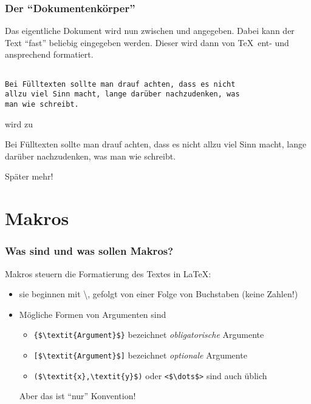 \begin{frame}[fragile]
  \frametitle{Der \enquote{Dokumentenkörper}}

  \onslide<+->

  Das eigentliche Dokument wird nun zwischen \lstinline!! und
    \lstinline!! angegeben.  Dabei kann der Text \enquote{fast} beliebig
  eingegeben werden.  Dieser wird dann von \TeX\ ent- und ansprechend formatiert.

  \onslide<+->

\begin{lstlisting}

Bei Fülltexten sollte man drauf achten, dass es nicht
allzu viel Sinn macht, lange darüber nachzudenken, was
man wie schreibt.

\end{lstlisting}

  wird zu\onslide<+->

  \begin{center}
    \parbox{0.8\linewidth}{\rm Bei Fülltexten sollte man drauf achten, dass es
      nicht allzu viel Sinn macht, lange darüber nachzudenken, was man wie schreibt.}
  \end{center}

  \onslide<+->

  Später mehr!

\end{frame}
\section{Makros}

\begin{frame}[fragile]
  \frametitle{Was sind und was sollen Makros?}

  \onslide<+->

  Makros steuern die Formatierung des Textes in \LaTeX:

  \begin{itemize}
  \item<+-> sie beginnen mit \textbackslash, gefolgt von einer Folge von Buchstaben (keine
    Zahlen!)
  \item<+-> Mögliche Formen von Argumenten sind
    \begin{itemize}
    \item \lstinline!{$\textit{Argument}$}! bezeichnet \emph{obligatorische} Argumente
    \item \lstinline![$\textit{Argument}$]! bezeichnet \emph{optionale} Argumente
    \item \lstinline!($\textit{x},\textit{y}$)! oder \lstinline!<$\dots$>! sind auch
      üblich
    \end{itemize}

    Aber das ist \enquote{nur} Konvention!
  \end{itemize}
\end{frame}

